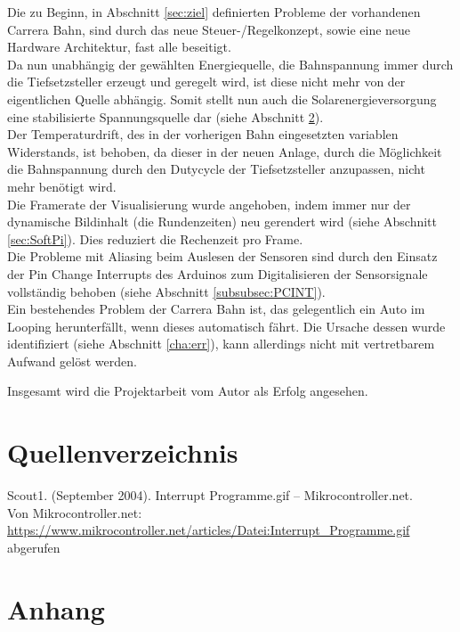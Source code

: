 \documentclass[a4paper, 11pt]{report}
\begin{document}
Die zu Beginn, in Abschnitt \ref{sec:ziel} definierten Probleme der vorhandenen Carrera Bahn, sind durch das neue Steuer-/Regelkonzept, sowie eine neue Hardware Architektur, fast alle beseitigt.\\ 
Da nun unabhängig der gewählten Energiequelle, die Bahnspannung immer durch die Tiefsetzsteller erzeugt und geregelt wird, ist diese nicht mehr von der eigentlichen Quelle abhängig.
Somit stellt nun auch die Solarenergieversorgung eine stabilisierte Spannungsquelle dar (siehe Abschnitt \ref{}).\\%
Der Temperaturdrift, des in der vorherigen Bahn eingesetzten variablen Widerstands, ist behoben, da dieser in der neuen Anlage, durch die Möglichkeit die Bahnspannung durch den Dutycycle der Tiefsetzsteller anzupassen, nicht mehr benötigt wird.\\
Die Framerate der Visualisierung wurde angehoben, indem immer nur der dynamische Bildinhalt (die Rundenzeiten) neu gerendert wird (siehe Abschnitt \ref{sec:SoftPi}). Dies reduziert die Rechenzeit pro Frame.\\
Die Probleme mit Aliasing beim Auslesen der Sensoren sind durch den Einsatz der \glqq Pin Change Interrupts\grqq{} des Arduinos zum Digitalisieren der Sensorsignale vollständig behoben (siehe Abschnitt \ref{subsubsec:PCINT}).\\

Ein bestehendes Problem der Carrera Bahn ist, das gelegentlich ein Auto im Looping herunterfällt, wenn dieses automatisch fährt. Die Ursache dessen wurde identifiziert (siehe Abschnitt \ref{cha:err}), kann allerdings nicht mit vertretbarem Aufwand gelöst werden.

Insgesamt wird die Projektarbeit vom Autor als Erfolg angesehen.
\chapter{Quellenverzeichnis}
Scout1. (September 2004). Interrupt Programme.gif – Mikrocontroller.net. 
\\Von Mikrocontroller.net: \href{https://www.mikrocontroller.net/articles/Datei:Interrupt_Programme.gif}
{\url{https://www.mikrocontroller.net/articles/Datei:Interrupt_Programme.gif}} abgerufen \label{src:scout1}
\chapter{Anhang}
\end{document}
